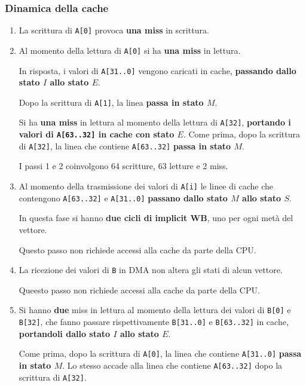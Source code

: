 \documentclass[a4paper]{article}
\begin{document}
\subsubsection{Dinamica della cache}
\begin{enumerate}
\item La scrittura di \texttt{A[0]} provoca \textbf{una miss} in scrittura.

\item Al momento della lettura di \texttt{A[0]} si ha \textbf{una miss} in lettura.

In risposta, i valori di \texttt{A[31..0]} vengono caricati in cache, \textbf{passando dallo stato $I$ allo stato $E$}. 

Dopo la scrittura di \texttt{A[1]}, la linea \textbf{passa in stato $M$}.

Si ha \textbf{una miss} in lettura al momento della lettura di \texttt{A[32]}, \textbf{portando i valori di \texttt{A[63..32]} in cache con stato $E$}.
Come prima, dopo la scrittura di \texttt{A[32]}, la linea che contiene \texttt{A[63..32]} \textbf{passa in stato $M$}.

I passi 1 e 2 coinvolgono 64 scritture, 63 letture e 2 miss.

\item Al momento della trasmissione dei valori di \texttt{A[i]} le linee di cache che contengono \texttt{A[63..32]} e \texttt{A[31..0]} \textbf{passano dallo stato $M$ allo stato $S$}.

In questa fase si hanno \textbf{due cicli di implicit WB}, uno per ogni metà del vettore.

Questo passo non richiede accessi alla cache da parte della CPU.

\item La ricezione dei valori di \texttt{B} in DMA non altera gli stati di alcun vettore.

Queesto passo non richiede accessi alla cache da parte della CPU.

\item Si hanno \textbf{due} miss in lettura al momento della lettura dei valori di \texttt{B[0]} e \texttt{B[32]}, che fanno passare rispettivamente \texttt{B[31..0]} e \texttt{B[63..32]} in cache, \textbf{portandoli dallo stato $I$ allo stato $E$}. 

Come prima, dopo la scrittura di \texttt{A[0]}, la linea che contiene \texttt{A[31..0]} \textbf{passa in stato $M$}.
Lo stesso accade alla linea che contiene \texttt{A[63..32]} dopo la scrittura di \texttt{A[32]}.


\end{enumerate}
\end{document}
